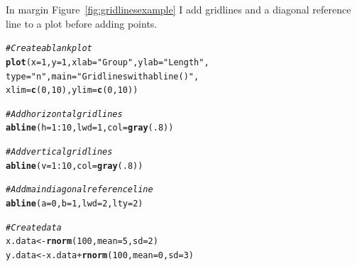 \documentclass{tufte-book}\usepackage[]{graphicx}\usepackage[]{color}
\makeatletter
\newcommand{\hlnum}[1]{\textcolor[rgb]{0.686,0.059,0.569}{#1}}%
\newcommand{\hlstr}[1]{\textcolor[rgb]{0.192,0.494,0.8}{#1}}%
\newcommand{\hlcom}[1]{\textcolor[rgb]{0.678,0.584,0.686}{\textit{#1}}}%
\newcommand{\hlopt}[1]{\textcolor[rgb]{0,0,0}{#1}}%
\newcommand{\hlstd}[1]{\textcolor[rgb]{0.345,0.345,0.345}{#1}}%
\newcommand{\hlkwb}[1]{\textcolor[rgb]{0.69,0.353,0.396}{#1}}%
\newcommand{\hlkwc}[1]{\textcolor[rgb]{0.333,0.667,0.333}{#1}}%
\newcommand{\hlkwd}[1]{\textcolor[rgb]{0.737,0.353,0.396}{\textbf{#1}}}%
\newenvironment{kframe}{%
 \def\at@end@of@kframe{}%
 \ifinner\ifhmode%
  \def\at@end@of@kframe{\end{minipage}}%
  \begin{minipage}{\columnwidth}%
 \fi\fi%
 \def\FrameCommand##1{\hskip\@totalleftmargin \hskip-\fboxsep
 \colorbox{shadecolor}{##1}\hskip-\fboxsep
     \hskip-\linewidth \hskip-\@totalleftmargin \hskip\columnwidth}%
 \MakeFramed {\advance\hsize-\width
   \@totalleftmargin\z@ \linewidth\hsize
   \@setminipage}}%
 {\par\unskip\endMakeFramed%
 \at@end@of@kframe}
\newenvironment{knitrout}{}{} %
\makeatother
\begin{document}
\begin{footnotesize}
In margin Figure~\ref{fig:gridlinesexample} I add gridlines and a diagonal reference line to a plot before adding points.

\begin{marginfigure}
\begin{tiny}
\begin{knitrout}
\color{fgcolor}\begin{kframe}
\begin{alltt}
\hlcom{# Create a blank plot}
\hlkwd{plot}\hlstd{(}\hlkwc{x} \hlstd{=} \hlnum{1}\hlstd{,} \hlkwc{y} \hlstd{=} \hlnum{1}\hlstd{,} \hlkwc{xlab} \hlstd{=} \hlstr{"Group"}\hlstd{,} \hlkwc{ylab} \hlstd{=} \hlstr{"Length"}\hlstd{,}
     \hlkwc{type} \hlstd{=} \hlstr{"n"}\hlstd{,} \hlkwc{main} \hlstd{=} \hlstr{"Gridlines with abline()"}\hlstd{,}
     \hlkwc{xlim} \hlstd{=} \hlkwd{c}\hlstd{(}\hlnum{0}\hlstd{,} \hlnum{10}\hlstd{),} \hlkwc{ylim} \hlstd{=} \hlkwd{c}\hlstd{(}\hlnum{0}\hlstd{,} \hlnum{10}\hlstd{))}

\hlcom{# Add horizontal gridlines}
\hlkwd{abline}\hlstd{(}\hlkwc{h} \hlstd{=} \hlnum{1}\hlopt{:}\hlnum{10}\hlstd{,} \hlkwc{lwd} \hlstd{=} \hlnum{1}\hlstd{,} \hlkwc{col} \hlstd{=} \hlkwd{gray}\hlstd{(}\hlnum{.8}\hlstd{))}

\hlcom{# Add vertical gridlines}
\hlkwd{abline}\hlstd{(}\hlkwc{v} \hlstd{=} \hlnum{1}\hlopt{:}\hlnum{10}\hlstd{,} \hlkwc{col} \hlstd{=} \hlkwd{gray}\hlstd{(}\hlnum{.8}\hlstd{))}

\hlcom{# Add main diagonal reference line}
\hlkwd{abline}\hlstd{(}\hlkwc{a} \hlstd{=} \hlnum{0}\hlstd{,} \hlkwc{b} \hlstd{=} \hlnum{1}\hlstd{,} \hlkwc{lwd} \hlstd{=} \hlnum{2}\hlstd{,} \hlkwc{lty} \hlstd{=} \hlnum{2}\hlstd{)}

\hlcom{# Create data}
\hlstd{x.data} \hlkwb{<-} \hlkwd{rnorm}\hlstd{(}\hlnum{100}\hlstd{,} \hlkwc{mean} \hlstd{=} \hlnum{5}\hlstd{,} \hlkwc{sd} \hlstd{=} \hlnum{2}\hlstd{)}
\hlstd{y.data} \hlkwb{<-} \hlstd{x.data} \hlopt{+} \hlkwd{rnorm}\hlstd{(}\hlnum{100}\hlstd{,} \hlkwc{mean} \hlstd{=} \hlnum{0}\hlstd{,} \hlkwc{sd} \hlstd{=} \hlnum{3}\hlstd{)}


\end{alltt}
\end{kframe}
\end{knitrout}
\end{tiny}
\end{marginfigure}
\end{footnotesize}
\end{document}
